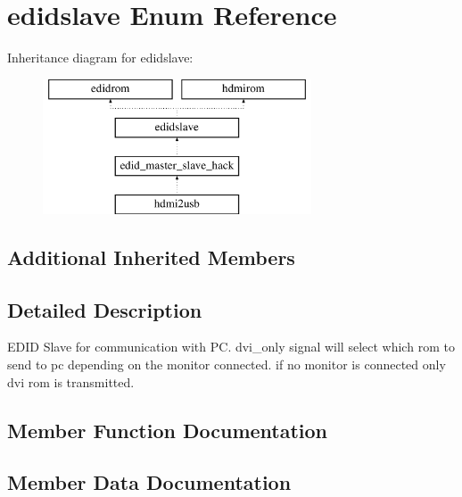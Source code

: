 \section{edidslave Enum Reference}
\label{enum1edidslave}
Inheritance diagram for edidslave\-:\begin{figure}[H]
\begin{center}
\leavevmode
\includegraphics[height=4.000000cm]{enum1edidslave}
\end{center}
\end{figure}
\subsection*{Additional Inherited Members}


\subsection{Detailed Description}
E\-D\-I\-D Slave for communication with P\-C. dvi\-\_\-only signal will select which rom to send to pc depending on the monitor connected. if no monitor is connected only dvi rom is transmitted. 

\subsection{Member Function Documentation}
\subsubsection[{P\-R\-O\-C\-E\-S\-S\-\_\-16}]{\setlength{\rightskip}{0pt plus 5cm}\hspace{0.3cm}}\label{enum1edidslave_aae9b98e25b80f11c0a2d412223b4fe8f}


\subsection{Member Data Documentation}
